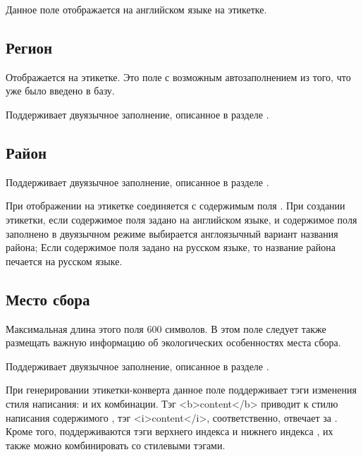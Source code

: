 \documentclass[letterpaper,10pt,russian]{sphinxmanual}
\begin{document}
Данное поле отображается на английском языке на этикетке.

\ignorespaces 

\subsection{Регион}
\label{\detokenize{main:id24}}\label{\detokenize{main:index-19}}
Отображается на этикетке. Это поле с возможным автозаполнением из того, что уже было введено в базу.

Поддерживает двуязычное заполнение, описанное в разделе {\hyperref[\detokenize{main:id14}]{}}.

\ignorespaces 

\subsection{Район}
\label{\detokenize{main:index-20}}\label{\detokenize{main:id25}}
Поддерживает двуязычное заполнение, описанное в разделе
{\hyperref[\detokenize{main:id14}]{}}.

При отображении на этикетке соединяется с содержимым поля .
При создании этикетки, если содержимое поля 
задано на английском языке, и содержимое поля  заполнено
в двуязычном режиме \textendash{} выбирается англоязычный вариант
названия района; Если содержимое поля
 задано на русском языке, то название района
печается на русском языке.

\ignorespaces 

\subsection{Место сбора}
\label{\detokenize{main:index-21}}\label{\detokenize{main:id26}}
Максимальная длина этого поля 600 символов.
В этом поле следует также размещать важную информацию об
экологических особенностях места сбора.

Поддерживает двуязычное заполнение, описанное в разделе {\hyperref[\detokenize{main:id14}]{}}.

При генерировании этикетки-конверта данное поле поддерживает тэги изменения
стиля написания:  и их комбинации.  Тэг \textless{}b\textgreater{}content\textless{}/b\textgreater{} \textendash{}
приводит к  стилю написания содержимого , тэг \textless{}i\textgreater{}content\textless{}/i\textgreater{}, соответственно,
отвечает за . Кроме того, поддерживаются тэги верхнего индекса  и
нижнего индекса , их также можно комбинировать со стилевыми тэгами.
\end{document}
